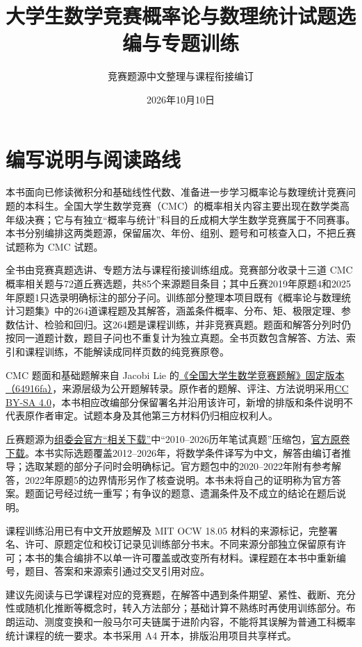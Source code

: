 \documentclass[UTF8,12pt,a4paper,fontset=fandol]{ctexbook}
\title{大学生数学竞赛概率论与数理统计试题选编与专题训练}
\author{竞赛题源中文整理与课程衔接编订}
\date{2026年10月10日}
\begin{document}
\maketitle
\chapter*{编写说明与阅读路线}
本书面向已修读微积分和基础线性代数、准备进一步学习概率论与数理统计竞赛问题的本科生。全国大学生数学竞赛（CMC）的概率相关内容主要出现在数学类高年级决赛；它与有独立“概率与统计”科目的丘成桐大学生数学竞赛属于不同赛事。本书分别编排这两类题源，保留届次、年份、组别、题号和可核查入口，不把丘赛试题称为 CMC 试题。

全书由竞赛真题选讲、专题方法与课程衔接训练组成。竞赛部分收录十三道 CMC 概率相关题与72道丘赛选题，共85个来源题目条目；其中丘赛2019年原题4和2025年原题1只选录明确标注的部分子问。训练部分整理本项目既有《概率论与数理统计习题集》中的264道课程题及其解答，涵盖条件概率、分布、矩、极限定理、参数估计、检验和回归。这264题是课程训练，并非竞赛真题。题面和解答分列时仍按同一道题计数，题目子问也不重复计为独立真题。全书页数包含解答、方法、索引和课程训练，不能解读成同样页数的纯竞赛原卷。

CMC 题面和基础题解来自 Jacobi Lie 的\href{https://github.com/lzxcr/cmc-mathematics/tree/64916fa1fdbc3e444a652eca204d5669058ee321}{《全国大学生数学竞赛题解》固定版本（64916fa）}，来源层级为公开题解转录。原作者的题解、评注、方法说明采用\href{https://creativecommons.org/licenses/by-sa/4.0/}{CC BY-SA 4.0}，本书相应改编部分保留署名并沿用该许可，新增的排版和条件说明不代表原作者审定。试题本身及其他第三方材料仍归相应权利人。

丘赛题源为\href{https://yau-contest.com/lists-jxxg.html}{组委会官方“相关下载”}中“2010--2026历年笔试真题”压缩包，\href{https://yau-contest.com/index/reldown?id=9}{官方原卷下载}。本书实际选题覆盖2012--2026年，将数学条件译写为中文，解答由编订者推导；选取某题的部分子问时会明确标记。官方题包中的2020--2022年附有参考解答，2022年原题5的边界情形另作了核查说明。本书未将自己的证明称为官方答案。题面记号经过统一重写；有争议的题意、遗漏条件及不成立的结论在题后说明。

课程训练沿用已有中文开放题解及 MIT OCW 18.05 材料的来源标记，完整署名、许可、原题定位和校订记录见训练部分书末。不同来源分部独立保留原有许可；本书的集合编排不以单一许可覆盖或改变所有材料。课程题在本书中重新编号，题目、答案和来源索引通过交叉引用对应。

建议先阅读与已学课程对应的竞赛题，在解答中遇到条件期望、紧性、截断、充分性或随机化推断等概念时，转入方法部分；基础计算不熟练时再使用训练部分。布朗运动、测度变换和一般马尔可夫链属于进阶内容，不能将其误解为普通工科概率统计课程的统一要求。本书采用 A4 开本，排版沿用项目共享样式。
\end{document}
